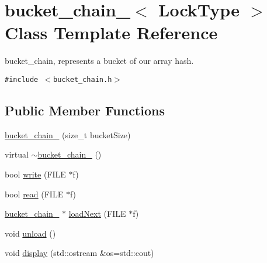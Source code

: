 \hypertarget{classbucket__chain__}{
\section{bucket\_\-chain\_\-$<$ LockType $>$ Class Template Reference}
\label{classbucket__chain__}
}
bucket\_\-chain, represents a bucket of our array hash.  


{\tt \#include $<$bucket\_\-chain.h$>$}

\subsection*{Public Member Functions}
\begin{CompactItemize}
\item 
\hyperlink{classbucket__chain___3405a155cb7df7c87aa5a0f659b18b9d}{bucket\_\-chain\_\-} (size\_\-t bucketSize)
\item 
virtual \hyperlink{classbucket__chain___e75a9fd222a47b2273979e156e9e3308}{$\sim$bucket\_\-chain\_\-} ()
\item 
bool \hyperlink{classbucket__chain___f237564af670084175b423af68bc85f0}{write} (FILE $\ast$f)
\item 
bool \hyperlink{classbucket__chain___1e08721b9b46d46aaabb41b4adc9e559}{read} (FILE $\ast$f)
\item 
\hyperlink{classbucket__chain__}{bucket\_\-chain\_\-} $\ast$ \hyperlink{classbucket__chain___b981d355afb14f9667b6593d8bfed523}{loadNext} (FILE $\ast$f)
\item 
void \hyperlink{classbucket__chain___2dccc2c72a6f9b5bda83f627e11124b8}{unload} ()
\item 
void \hyperlink{classbucket__chain___ff30da7f833bbe9b05c523d23658bf1e}{display} (std::ostream \&os=std::cout)
\end{CompactItemize}
